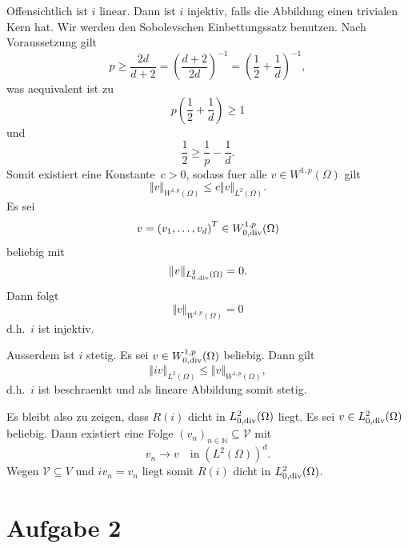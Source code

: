\documentclass{article}
\begin{document}
Offensichtlich ist $i$ linear. Dann ist $i$ injektiv, falls die Abbildung einen trivialen Kern hat. Wir werden den Sobolevschen Einbettungs\-satz benutzen. Nach Voraussetzung gilt
\begin{equation*}
  p
  \geq \frac{2d}{d+2}
  = \left(\frac{d+2}{2d} \right)^{-1}
  = \left(\frac{1}{2} + \frac{1}{d} \right)^{-1},
\end{equation*}
was aequivalent ist zu
\begin{equation*}
  p \left(\frac{1}{2} + \frac{1}{d} \right)
  \geq 1
\end{equation*}
und
\begin{equation*}
  \frac{1}{2}
  \geq \frac{1}{p}
  - \frac{1}{d}.
\end{equation*}
Somit existiert eine Konstante~$c>0$, sodass fuer alle $v \in W^{1,p}(\Omega)$ gilt
\begin{equation*}
  \Vert v \Vert_{W_{}^{1,p}(\Omega)}
  \leq c \Vert v \Vert_{L_{}^2(\Omega)}.
\end{equation*}
Es sei
\begin{equation*}
  v = {(v_1, \dots, v_d)}^T \in W_{0, \operatorname{div}}^{1,p}(\Omega)
\end{equation*}
beliebig mit
\begin{equation*}
  \Vert v \Vert_{L_{0, \operatorname{div}}^2(\Omega)}
  = 0.
\end{equation*}
Dann folgt
\begin{equation*}
  \Vert v \Vert_{W_{}^{1,p}(\Omega)}
  = 0
\end{equation*}
d.h.\ $i$ ist injektiv. 

Ausserdem ist $i$ stetig. Es sei $v \in W_{0, \operatorname{div}}^{1,p}(\Omega)$ beliebig. Dann gilt
\begin{equation*}
  \Vert iv \Vert_{L^2(\Omega)}
  \leq \Vert v \Vert_{W^{1,p}(\Omega)},
\end{equation*}
d.h.\ $i$ ist beschraenkt und als lineare Abbildung somit stetig.

Es bleibt also zu zeigen, dass $R(i)$ dicht in $L_{0, \operatorname{div}}^2(\Omega)$ liegt. Es sei $v \in L_{0, \operatorname{div}}^2(\Omega)$ beliebig. Dann existiert eine Folge $(v_n)_{n \in \mathbb{N}} \subseteq \mathcal{V}$ mit
\begin{equation*}
  v_n \rightarrow v \quad \text{in} \; (L^2(\Omega))^d.
\end{equation*}
Wegen $\mathcal{V} \subseteq V$ und $iv_n = v_n$ liegt somit $R(i)$ dicht in $L_{0, \operatorname{div}}^2(\Omega)$.


\section*{Aufgabe 2}
\end{document}
